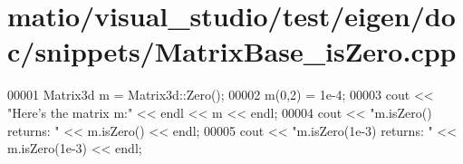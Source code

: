 \hypertarget{matio_2visual__studio_2test_2eigen_2doc_2snippets_2_matrix_base__is_zero_8cpp_source}{}\section{matio/visual\+\_\+studio/test/eigen/doc/snippets/\+Matrix\+Base\+\_\+is\+Zero.cpp}
\label{matio_2visual__studio_2test_2eigen_2doc_2snippets_2_matrix_base__is_zero_8cpp_source}

\begin{DoxyCode}
00001 Matrix3d m = Matrix3d::Zero();
00002 m(0,2) = 1e-4;
00003 cout << \textcolor{stringliteral}{"Here's the matrix m:"} << endl << m << endl;
00004 cout << \textcolor{stringliteral}{"m.isZero() returns: "} << m.isZero() << endl;
00005 cout << \textcolor{stringliteral}{"m.isZero(1e-3) returns: "} << m.isZero(1e-3) << endl;
\end{DoxyCode}

